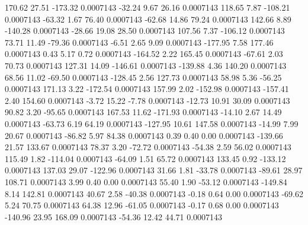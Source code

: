       170.62       27.51     -173.32     0.0007143
      -32.24        9.67       26.16     0.0007143
      118.65        7.87     -108.21     0.0007143
      -63.32        1.67       76.40     0.0007143
      -62.68       14.86       79.24     0.0007143
      142.66        8.89     -140.28     0.0007143
      -28.66       19.08       28.50     0.0007143
      107.56        7.37     -106.12     0.0007143
       73.71       11.49      -79.36     0.0007143
       -6.51        2.65        9.09     0.0007143
     -177.95        7.58      177.46     0.0007143
        0.43        5.17        0.72     0.0007143
     -164.52        2.22      165.45     0.0007143
      -67.61        2.03       70.73     0.0007143
      127.31       14.09     -146.61     0.0007143
     -139.88        4.36      140.20     0.0007143
       68.56       11.02      -69.50     0.0007143
     -128.45        2.56      127.73     0.0007143
       58.98        5.36      -56.25     0.0007143
      171.13        3.22     -172.54     0.0007143
      157.99        2.02     -152.98     0.0007143
     -157.41        2.40      154.60     0.0007143
       -3.72       15.22       -7.78     0.0007143
      -12.73       10.91       30.09     0.0007143
       90.82        3.20      -95.65     0.0007143
      167.53       11.62     -171.93     0.0007143
      -14.10        2.67       14.49     0.0007143
      -63.73        6.19       64.19     0.0007143
     -127.95       10.61      147.58     0.0007143
      -14.99        7.99       20.67     0.0007143
      -86.82        5.97       84.38     0.0007143
        0.39        0.40        0.00     0.0007143
     -139.66       21.57      133.67     0.0007143
       78.37        3.20      -72.72     0.0007143
      -54.38        2.59       56.02     0.0007143
      115.49        1.82     -114.04     0.0007143
      -64.09        1.51       65.72     0.0007143
      133.45        0.92     -133.12     0.0007143
      137.03       29.07     -122.96     0.0007143
       31.66        1.81      -33.78     0.0007143
      -89.61       28.97      108.71     0.0007143
        3.99        0.40        0.00     0.0007143
       55.40        1.90      -53.12     0.0007143
     -149.84        8.14      142.81     0.0007143
       40.67        2.58      -40.38     0.0007143
       -0.18        0.64        0.00     0.0007143
      -69.62        5.24       70.75     0.0007143
       64.38       12.96      -61.05     0.0007143
       -0.17        0.68        0.00     0.0007143
     -140.96       23.95      168.09     0.0007143
      -54.36       12.42       44.71     0.0007143
